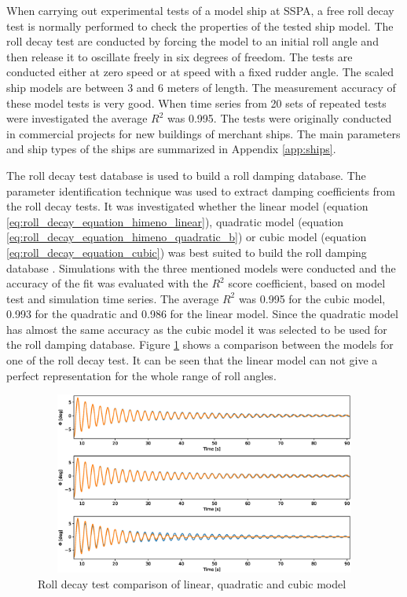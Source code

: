 When carrying out experimental tests of a model ship at SSPA, a free roll decay test is normally performed to check the properties of the tested ship model.
The roll decay test are conducted by forcing the model to an initial roll angle and then release it to oscillate freely in six degrees of freedom. The tests are conducted either  at zero speed or at speed with a fixed rudder angle. The scaled ship models are between 3 and 6 meters of length. The measurement accuracy of these model tests is very good. When time series from 20 sets of repeated tests were investigated the average $R^2$ was 0.995. The tests were originally conducted in commercial projects for new buildings of merchant ships. The main parameters and ship types of the ships are summarized in Appendix \ref{app:ships}. 

The roll decay test database is used to build a roll damping database. The parameter identification technique was used to extract damping coefficients from the roll decay tests. It was investigated whether the linear model (equation \ref{eq:roll_decay_equation_himeno_linear}), quadratic model (equation \ref{eq:roll_decay_equation_himeno_quadratic_b}) or cubic model (equation \ref{eq:roll_decay_equation_cubic}) was best suited  to build the roll damping database . Simulations with the three mentioned models were conducted and the accuracy of the fit was evaluated with the $R^2$ score coefficient, based on model test and simulation time series.
The average $R^2$ was 0.995 for the cubic model, 0.993 for the quadratic and 0.986 for the linear model. Since the quadratic model has almost the same accuracy as the cubic model it was selected to be used for the roll damping database. Figure \ref{fig:roll_decay_model_compare} shows a comparison between the models for one of the roll decay test. It can be seen that the linear model can not give a perfect representation for the whole range of roll angles.

\begin{figure}[H]
    \centering
    \includegraphics[width=12cm, height = 6cm ]{figures/roll_decay_model_compare.eps}
    \caption{Roll decay test comparison of linear, quadratic and cubic model}
    \label{fig:roll_decay_model_compare}
\end{figure}

